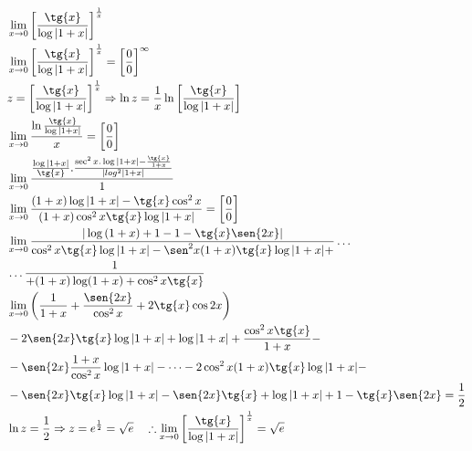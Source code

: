 \begin{ex}
\begin{align}
&\lim_{x\rightarrow 0} \left[\frac{\tg{x}}{\log{|1+x|}}\right]^{\frac{1}{x}}\nonumber\\
&\lim_{x\rightarrow 0} \left[\frac{\tg{x}}{\log{|1+x|}}\right]^{\frac{1}{x}}=\left[\frac{0}{0}\right]^{\infty}\nonumber\\
&z=\left[\frac{\tg{x}}{\log{|1+x|}}\right]^{\frac{1}{x}} \Rightarrow \ln{z}=\frac{1}{x} \ln{\left[\frac{\tg{x}}{\log{|1+x|}}\right]}\nonumber\\
&\lim_{x\rightarrow 0} \frac{\ln{\frac{\tg{x}}{\log{|1+x|}}}}{x}=\left[\frac{0}{0}\right]\nonumber\\
&\lim_{x\rightarrow 0} \frac{\frac{\log{|1+x|}}{\tg{x}}.\frac{\sec^2{x}.\log{|1+x|}-\frac{\tg{x}}{1+x}}{|log^2{|1+x|}}}{1}\nonumber\\
&\lim_{x\rightarrow 0} \frac{(1+x)\log{|1+x|}-\tg{x}\cos^2{x}}{(1+x)\cos^2{x}\tg{x}\log{|1+x|}}=\left[\frac{0}{0}\right]\nonumber\\
&\lim_{x\rightarrow 0} \frac{|\log{(1+x)}+1-1-\tg{x}\sen{2x}|}{\cos^2{x}\tg{x}\log{|1+x|}-\sen^2{x}(1+x)\tg{x}\log{|1+x|}+}\dots\nonumber\\
&\dots \frac{1}{+(1+x)\log(1+x)+\cos^2{x}\tg{x}}\nonumber\\
&\lim_{x\rightarrow 0} \left(\frac{1}{1+x}+\frac{\sen{2x}}{\cos^2{x}}+2\tg{x}\cos{2x}\right)\nonumber\\
&-2\sen{2x}\tg{x}\log{|1+x|}+\log{|1+x|}+\frac{\cos^2{x}\tg{x}}{1+x}-\nonumber\\
&-\sen{2x}\frac{1+x}{\cos^2{x}}\log{|1+x|}-\dots-2\cos^2{x}(1+x)\tg{x}\log{|1+x|}-\nonumber\\
&-\sen{2x}\tg{x}\log{|1+x|}-\sen{2x}\tg{x}+\log{|1+x|}+1-\tg{x}\sen{2x}=\frac{1}{2}\nonumber\\
&\ln{z}=\frac{1}{2} \Rightarrow z=e^{\frac{1}{2}}=\sqrt{e} \quad \therefore \lim_{x\rightarrow 0} \left[\frac{\tg{x}}{\log{|1+x|}}\right]^{\frac{1}{x}}=\sqrt{e}\nonumber
\end{align}
\end{ex}

